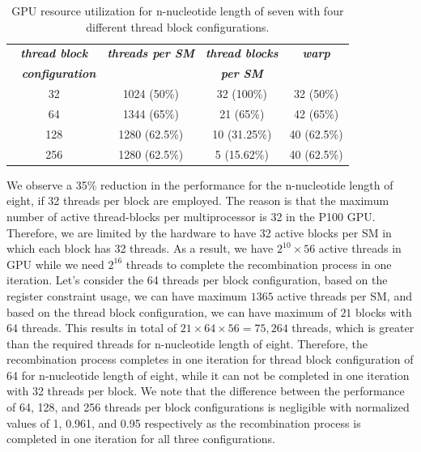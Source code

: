 \begin{table}[t!]
\caption{GPU resource utilization for n-nucleotide length of seven with four different thread block configurations.}

\begin{center}
\begin{tabular}{ |c|c|c|c|}
  \hline
   \textbf{\textit{ thread block }} & \textbf{\textit{threads per SM}} & \textbf{\textit{thread blocks}} & \textbf{\textit{warp}}\\	
   ~ \textbf{\textit{ configuration}} & &\textbf{\textit{ per SM}} & \\ \hline
    32 & 1024 (50\%) & 32 (100\%) & 32 (50\%) \\	\hline
    64 & 1344 (65\%) & 21 (65\%) & 42 (65\%)\\ 	\hline
    128 & 1280 (62.5\%) & 10 (31.25\%) & 40 (62.5\%)\\	\hline
    256 & 1280 (62.5\%) & 5 (15.62\%) & 40 (62.5\%)\\
  \hline
\end{tabular}
\label{tab:threadblock}
\end{center}
\end{table}


We observe a 35\% reduction in the performance for the n-nucleotide length of eight, if 32 threads per block are employed. The reason is that the maximum number of active thread-blocks per multiprocessor is 32 in the P100 GPU. Therefore, we are limited by the hardware to have 32 active blocks per SM in which each block has 32 threads. As a result, we have $2^{10}\times56$ active threads in GPU while we need $2^{16}$ threads to complete the recombination process in one iteration. Let's consider the 64 threads per block configuration, based on the register constraint usage, we can have maximum $1365$ active threads per SM, and based on the thread block configuration, we can have maximum of $21$ blocks with $64$ threads. This results in total of $21\times64\times56=75,264$ threads, which is greater than the required threads for n-nucleotide length of eight. Therefore, the recombination process completes in one iteration for thread block configuration of 64 for n-nucleotide length of eight, while it can not be completed in one iteration with 32 threads per block. We note that the difference between the performance of 64, 128, and 256 threads per block configurations is negligible with normalized values of 1, 0.961, and 0.95 respectively as the recombination process is completed in one iteration for all three configurations.

